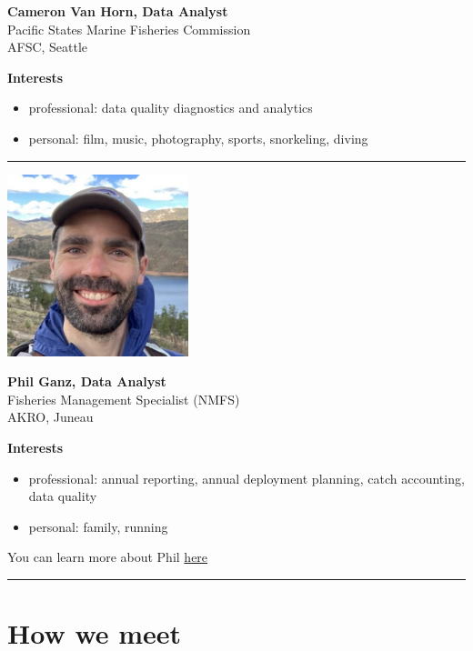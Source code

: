 \documentclass[
  letterpaper,
  DIV=11,
  numbers=noendperiod]{scrreprt}
\providecommand{\tightlist}{%
  \setlength{\itemsep}{0pt}\setlength{\parskip}{0pt}}\usepackage{longtable,booktabs,array}
\begin{document}
\textbf{Cameron Van Horn, Data Analyst}\\
Pacific States Marine Fisheries Commission\\
AFSC, Seattle

\textbf{Interests}

\begin{itemize}
\tightlist
\item
  professional: data quality diagnostics and analytics\\
\item
  personal: film, music, photography, sports, snorkeling, diving
\end{itemize}

\begin{center}\rule{0.5\linewidth}{0.5pt}\end{center}

\includegraphics[width=\textwidth,height=2.08333in]{_img/PhilGanz.jpg}

\textbf{Phil Ganz, Data Analyst}\\
Fisheries Management Specialist (NMFS)\\
AKRO, Juneau

\textbf{Interests}

\begin{itemize}
\tightlist
\item
  professional: annual reporting, annual deployment planning, catch
  accounting, data quality\\
\item
  personal: family, running
\end{itemize}

You can learn more about Phil
\href{https://www.fisheries.noaa.gov/contact/phil-ganz}{here}

\begin{center}\rule{0.5\linewidth}{0.5pt}\end{center}

\section{How we meet}\label{how-we-meet}
\end{document}
